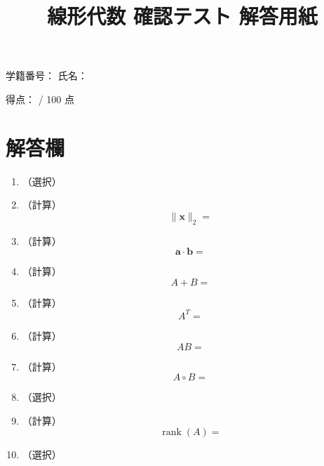 \documentclass[uplatex,a4paper,12pt]{jsarticle}
\begin{document}
\title{線形代数 確認テスト 解答用紙}
\author{}
\date{}
\maketitle

\noindent
学籍番号：\underline{\hspace{5cm}} \hfill
氏名：\underline{\hspace{5cm}}

\vspace{5mm}

\noindent
得点：\underline{\hspace{3cm}} / 100 点

\vspace{8mm}

\section*{解答欄}

\begin{enumerate}

\item（選択）\quad \underline{\hspace{3cm}}

\vspace{6mm}

\item（計算）
\[
\|\mathbf{x}\|_2 =
\]
\vspace{20mm}

\item（計算）
\[
\mathbf{a}\cdot\mathbf{b} =
\]
\vspace{20mm}

\item（計算）
\[
A+B =
\]
\vspace{25mm}

\item（計算）
\[
A^T =
\]
\vspace{25mm}

\item（計算）
\[
AB =
\]
\vspace{25mm}

\item（計算）
\[
A\circ B =
\]
\vspace{25mm}

\item（選択）\quad \underline{\hspace{5cm}}

\vspace{8mm}

\item（計算）
\[
\operatorname{rank}(A) =
\]
\vspace{20mm}

\item（選択）\quad \underline{\hspace{3cm}}

\end{enumerate}
\end{document}
